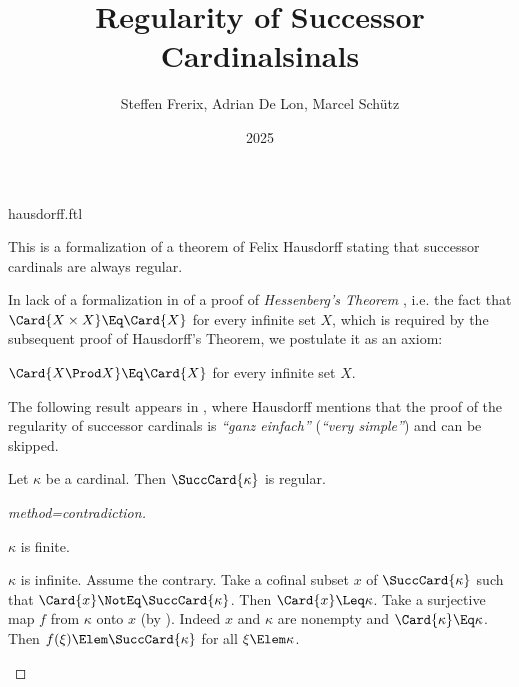 \documentclass{stex}
\title{Regularity of Successor Cardinalsinals}
\author{Steffen Frerix, Adrian De Lon, Marcel Schütz}
\date{2025}
\begin{document}
\begin{smodule}{hausdorff.ftl}



\maketitle

\noindent This is a formalization of a theorem of Felix Hausdorff stating that
successor cardinals are always regular.

In lack of a formalization in \Naproche of a proof of \emph{Hessenberg's
Theorem} \cite{Hessenberg1906}, i.e. the fact that
$\Card{X \times X} \Eq \Card{X}$ for every
infinite set $X$, which is required by the subsequent
proof of Hausdorff's Theorem, we postulate it as an axiom:

\begin{axiom*}[forthel,title=Hessenberg's Theorem,name=Hessenberg]
  $\Card{X \Prod X} \Eq \Card{X}$ for every infinite set $X$.
\end{axiom*}

The following result appears in \cite[p.~443]{Hausdorff1908},
where Hausdorff mentions that the proof of the regularity of successor
cardinals is \textit{``ganz einfach''} (\textit{``very simple''})
and can be skipped.

\begin{forthel}
  \begin{theorem*}[title=Hausdorff,name=Hausdorff]
    Let $\kappa$ be a cardinal.
    Then $\SuccCard{\kappa}$ is regular.
  \end{theorem*}
  \begin{proof}[method=contradiction]
    \begin{case}{$\kappa$ is finite.} \end{case}

    \begin{case}{$\kappa$ is infinite.}
      Assume the contrary.
      Take a cofinal subset $x$ of $\SuccCard{\kappa}$ such that $\Card{x} \NotEq \SuccCard{\kappa}$.
      Then $\Card{x} \Leq \kappa$.
      Take a surjective map $f$ from $\kappa$ onto $x$ (by ).
      Indeed $x$ and $\kappa$ are nonempty and $\Card{\kappa} \Eq \kappa$.
      Then $f(\xi) \Elem \SuccCard{\kappa}$ for all $\xi \Elem \kappa$.
  

\end{case}
\end{proof}
\end{forthel}
\end{smodule}
\end{document}
